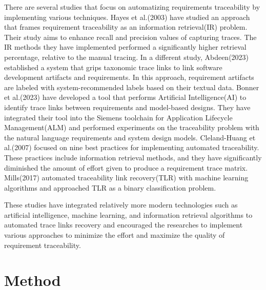 \documentclass[conference]{IEEEtran}
\begin{document}
There are several studies that focus on automatizing requirements traceability by implementing various techniques. Hayes et al.(2003) have studied an approach that frames requirement traceability as an information retrieval(IR) problem. Their study aims to enhance recall and precision values of capturing traces. The IR methods they have implemented performed a significantly higher retrieval percentage, relative to the manual tracing. In a different study, Abdeen(2023) established a system that grips taxonomic trace links to link software development artifacts and requirements. In this approach, requirement artifacts are labeled with system-recommended labels based on their textual data. Bonner et al.(2023) have developed a tool that performs Artificial Intelligence(AI) to identify trace links between requirements and model-based designs. They have integrated their tool into the Siemens toolchain for Application Lifecycle Management(ALM) and performed experiments on the traceability problem with the natural language requirements and system design models. Cleland-Huang et al.(2007) focused on nine best practices for implementing automated traceability. These practices include information retrieval methods, and they have significantly diminished the amount of effort given to produce a requirement trace matrix. Mills(2017) automated traceability link recovery(TLR) with machine learning algorithms and approached TLR as a binary classification problem.

These studies have integrated relatively more modern technologies such as artificial intelligence, machine learning, and information retrieval algorithms to automated trace links recovery and encouraged the researches to implement various approaches to minimize the effort and maximize the quality of requirement traceability.



\section{Method}
\label{section:method}
\end{document}
